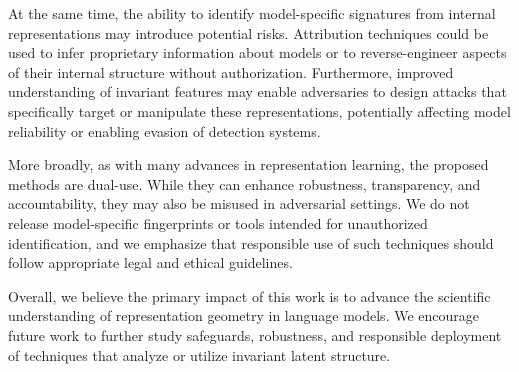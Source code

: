 At the same time, the ability to identify model-specific signatures from internal representations may introduce potential risks. Attribution techniques could be used to infer proprietary information about models or to reverse-engineer aspects of their internal structure without authorization. Furthermore, improved understanding of invariant features may enable adversaries to design attacks that specifically target or manipulate these representations, potentially affecting model reliability or enabling evasion of detection systems.

More broadly, as with many advances in representation learning, the proposed methods are dual-use. While they can enhance robustness, transparency, and accountability, they may also be misused in adversarial settings. We do not release model-specific fingerprints or tools intended for unauthorized identification, and we emphasize that responsible use of such techniques should follow appropriate legal and ethical guidelines.

Overall, we believe the primary impact of this work is to advance the scientific understanding of representation geometry in language models. We encourage future work to further study safeguards, robustness, and responsible deployment of techniques that analyze or utilize invariant latent structure.

